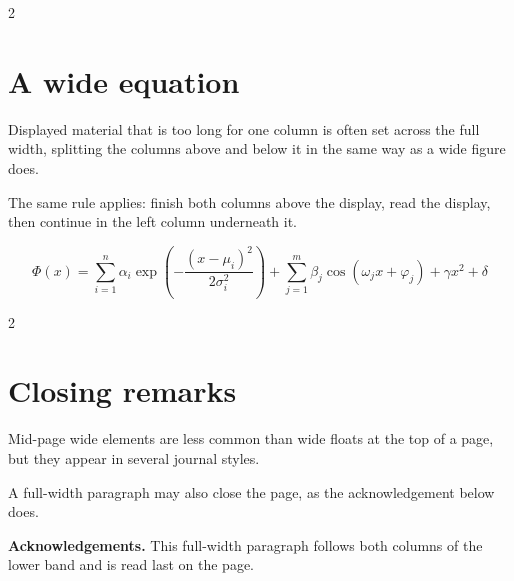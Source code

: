 \documentclass[10pt]{article}
\begin{document}
\clearpage

\begin{multicols}{2}
\section{A wide equation}

Displayed material that is too long for one column is often set across the
full width, splitting the columns above and below it in the same way as a
wide figure does.

\columnbreak

The same rule applies: finish both columns above the display, read the
display, then continue in the left column underneath it.
\end{multicols}

\begin{equation}
  \Phi(x) = \sum_{i=1}^{n} \alpha_i \exp\!\left(-\frac{(x-\mu_i)^2}{2\sigma_i^2}\right)
  + \sum_{j=1}^{m} \beta_j \cos(\omega_j x + \varphi_j) + \gamma x^2 + \delta
  \label{eq:wide}
\end{equation}

\begin{multicols}{2}
\section{Closing remarks}

Mid-page wide elements are less common than wide floats at the top of a
page, but they appear in several journal styles.

\columnbreak

A full-width paragraph may also close the page, as the acknowledgement below
does.
\end{multicols}

\noindent\textbf{Acknowledgements.} This full-width paragraph follows both
columns of the lower band and is read last on the page.
\end{document}
